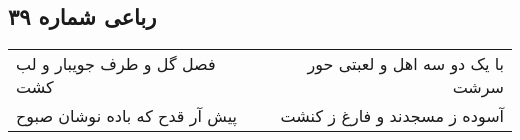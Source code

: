 \begin{center}
\section*{رباعی شماره ۳۹}
\label{sec:sh039}
\begin{longtable}{l p{0.5cm} r}
فصل گل و طرف جویبار و لب کشت
&&
با یک دو سه اهل و لعبتی حور سرشت
\\
پیش آر قدح که باده نوشان صبوح
&&
آسوده ز مسجدند و فارغ ز کنشت
\\
\end{longtable}
\end{center}
